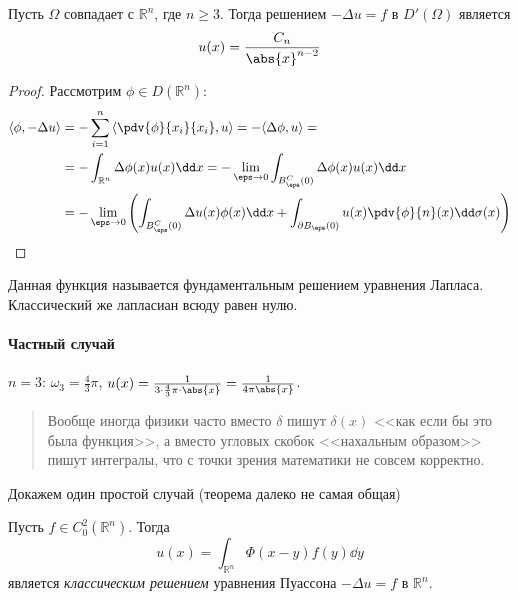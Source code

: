 \begin{thm*}
  Пусть $\Omega$ совпадает с $\mathbb{R}^n$, где $n \ge 3$. Тогда решением $-\Delta u = f$ в $D'(\Omega)$ является
  \begin{equation}
    u(x) = \frac{C_n}{\abs{x}^{n-2}}
  \end{equation}
\end{thm*}

\begin{proof}
  Рассмотрим $\phi \in D(\mathbb{R}^n)$:
  \begin{equation}
    \begin{aligned}
      \langle \phi, -\Delta u \rangle &= - \sum_{i=1}^n \left\langle \pdv{\phi}{x_i}{x_i}, u \right\rangle = - \langle \Delta \phi, u \rangle = \\
      &= -\int_{\mathbb{R}^n} \Delta \phi(x) u(x) \dd x = - \lim_{\eps \to 0} \int_{B_\eps^C(0)} \Delta \phi(x) u(x) \dd x \\
      &= -\lim_{\eps \to 0} \left(\int_{B_\eps^C(0)} \Delta u(x) \phi(x) \dd x + \int_{\partial B_\eps(0)} u(x) \pdv{\phi}{n} (x) \dd \sigma(x) \right)
    \end{aligned}
  \end{equation}
  
  
\end{proof}

Данная функция называется фундаментальным решением уравнения Лапласа. Классический же лапласиан всюду равен нулю.

\paragraph{Частный случай}

$n = 3$: $\omega_3 = \frac{4}{3} \pi$, $u(x) = \frac{1}{3 \cdot \frac{4}{3} \pi \cdot \abs{x}} = \frac{1}{4 \pi \abs{x}}$.

\begin{quote}
  Вообще иногда физики часто вместо $\delta$ пишут $\delta(x)$ <<как если бы это была функция>>, а вместо угловых скобок <<нахальным образом>> пишут интегралы, что с точки зрения математики не совсем корректно.
\end{quote}


Докажем один простой случай (теорема далеко не самая общая)
\begin{thm}
  Пусть $f \in C^2_0(\mathbb{R}^n)$. Тогда
  \begin{equation}
    u(x) = \int_{\mathbb{R}^n} \Phi(x-y) f(y) \dd y
  \end{equation}
  является \emph{классическим решением} уравнения Пуассона $-\Delta u = f$ в $\mathbb{R}^n$.
\end{thm}

